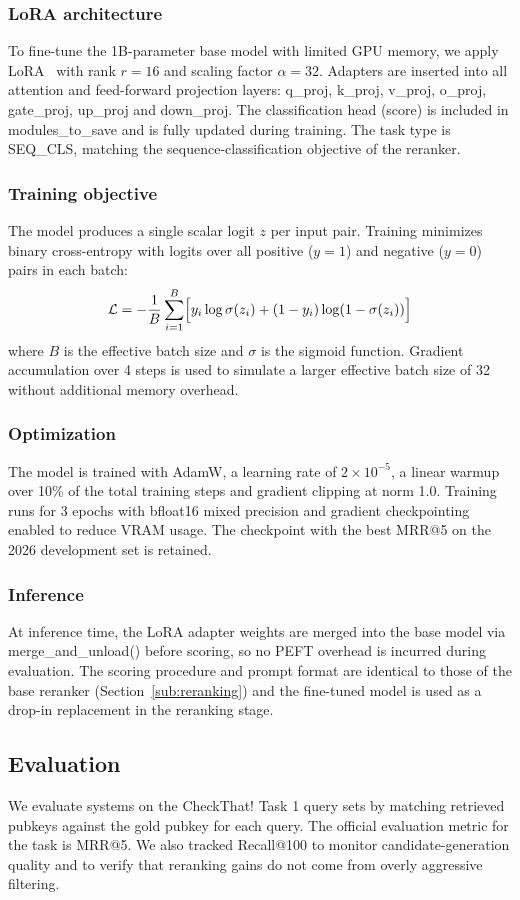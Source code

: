 \subsubsection{LoRA architecture}
To fine-tune the 1B-parameter base model with limited GPU memory, we apply LoRA~\cite{hu2022lora} with rank $r = 16$ and scaling factor $\alpha = 32$. Adapters are inserted into all attention and feed-forward projection layers:
q\_proj, k\_proj, v\_proj, o\_proj, gate\_proj, up\_proj and down\_proj.
The classification head (score) is included in
modules\_to\_save and is fully updated during training. The task type is SEQ\_CLS, matching the sequence-classification objective of the reranker.

\subsubsection{Training objective}
The model produces a single scalar logit $z$ per input pair.
Training minimizes binary cross-entropy with logits over all
positive ($y=1$) and negative ($y=0$) pairs in each batch:
\[
    \mathcal{L} = -\frac{1}{B}\sum_{i=1}^{B}
    \Bigl[ y_i \log \sigma(z_i) + (1 - y_i)\log(1 - \sigma(z_i)) \Bigr]
\]
where $B$ is the effective batch size and $\sigma$ is the sigmoid function. Gradient accumulation over 4 steps is used to simulate a larger effective batch size of 32 without additional memory overhead.

\subsubsection{Optimization}
The model is trained with AdamW, a learning rate of $2 \times 10^{-5}$, a linear warmup over 10\% of the total training steps and gradient clipping at norm 1.0. Training runs for 3 epochs with bfloat16 mixed precision and gradient checkpointing enabled to reduce VRAM usage. The checkpoint with the best MRR@5 on the 2026 development set is retained.

\subsubsection{Inference}
At inference time, the LoRA adapter weights are merged into the base model via merge\_and\_unload() before scoring, so no PEFT overhead is incurred during evaluation. The scoring procedure and prompt format are identical to those of the base reranker (Section~\ref{sub:reranking}) and the fine-tuned model is used as a drop-in replacement in the reranking stage.

\subsection{Evaluation}
We evaluate systems on the CheckThat! Task 1 query sets by matching retrieved pubkeys against the gold pubkey for each query. The official evaluation metric for the task is MRR@5. We also tracked Recall@100 to monitor candidate-generation quality and to verify that reranking gains do not come from overly aggressive filtering.
\clearpage